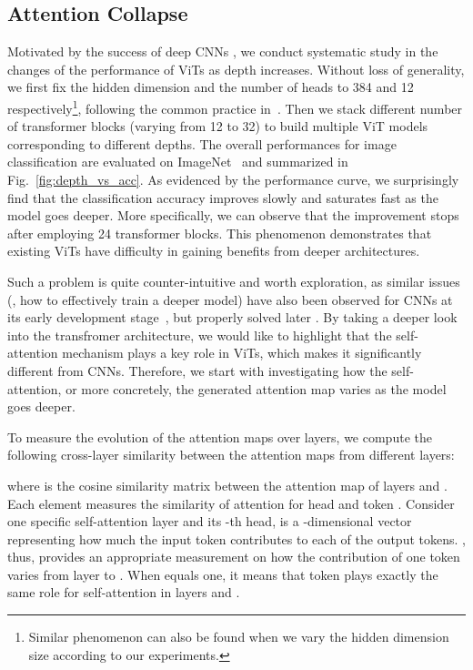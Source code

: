 \documentclass[10pt,twocolumn,letterpaper]{article}
\begin{document}
\subsection{Attention Collapse}



Motivated by the success of deep CNNs \cite{he2016deep,simonyan2014very, tan2019efficientnet, tan2019mixconv}, we conduct   systematic study in the changes of the performance of ViTs as depth increases.
Without loss of generality, we first fix the hidden dimension  and 
the number of heads to 384 and 12 respectively\footnote{Similar phenomenon can also
be found when we vary the hidden dimension size according to our experiments.}, following the common  practice in~\cite{touvron2020training}.
Then we stack different number of transformer blocks (varying from 12 to 32) to build multiple ViT models corresponding to different depths. The overall performances for image classification are evaluated on ImageNet~\cite{krizhevsky2012imagenet} and summarized in Fig.~\ref{fig:depth_vs_acc}.
As evidenced by the performance curve, we surprisingly find that the classification accuracy improves slowly and saturates fast as the model goes deeper. More specifically, we can observe that the improvement stops after employing 24 transformer blocks. This phenomenon demonstrates that  existing ViTs have difficulty in gaining benefits from deeper architectures. 


Such a problem is quite counter-intuitive and worth exploration, as similar issues (\ie, how to effectively train a deeper  model) have also been observed for CNNs at its early development stage~\cite{he2016deep}, but properly solved later \cite{he2016deep,he2016identity}. By taking a deeper look into the transfromer architecture, we would like to highlight that the self-attention mechanism plays a key role in ViTs, which makes it significantly different from CNNs. Therefore,  we  start with  investigating how the self-attention, or more concretely, the generated attention map  varies as the model goes deeper. 


To measure the evolution of the attention maps over layers, we compute the following
cross-layer similarity between the attention maps from different layers:

where  is the cosine similarity matrix between the attention map of layers  and . Each element  measures the similarity of attention for head  and token . {Consider one specific self-attention layer and its -th head,  is a -dimensional vector representing how much the input token  contributes to each of the  output tokens. 
, thus, provides an appropriate measurement on how the contribution of one token varies from layer  to . When  equals one, it means that token  plays exactly the same role for self-attention in layers  and .}
\end{document}
